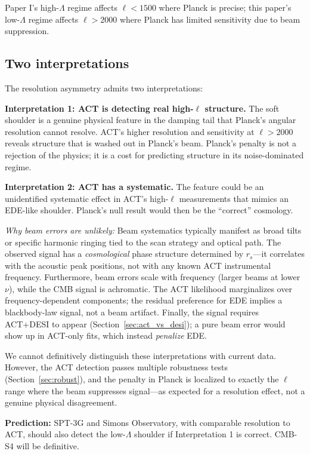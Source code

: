 \documentclass[twocolumn,showpacs,preprintnumbers,amsmath,amssymb,prd]{revtex4-2}
\begin{document}
Paper I's high-$\Lambda$ regime affects $\ell < 1500$ where Planck is precise; 
this paper's low-$\Lambda$ regime affects $\ell > 2000$ where Planck has 
limited sensitivity due to beam suppression.

\subsection{Two interpretations}

The resolution asymmetry admits two interpretations:

\textbf{Interpretation 1: ACT is detecting real high-$\ell$ structure.}
The soft shoulder is a genuine physical feature in the damping tail that 
Planck's angular resolution cannot resolve. ACT's higher resolution and 
sensitivity at $\ell > 2000$ reveals structure that is washed out in 
Planck's beam. Planck's penalty is not a rejection of the physics; it is 
a cost for predicting structure in its noise-dominated regime.

\textbf{Interpretation 2: ACT has a systematic.}
The feature could be an unidentified systematic effect in ACT's high-$\ell$ 
measurements that mimics an EDE-like shoulder. Planck's null result would 
then be the ``correct'' cosmology.

\emph{Why beam errors are unlikely:} Beam systematics typically manifest as 
broad tilts or specific harmonic ringing tied to the scan strategy and 
optical path. The observed signal has a \emph{cosmological} phase structure 
determined by $r_s$---it correlates with the acoustic peak positions, not 
with any known ACT instrumental frequency. Furthermore, beam errors scale 
with frequency (larger beams at lower $\nu$), while the CMB signal is 
achromatic. The ACT likelihood marginalizes over frequency-dependent 
components; the residual preference for EDE implies a blackbody-law signal, 
not a beam artifact. Finally, the signal requires ACT+DESI to appear 
(Section~\ref{sec:act_vs_desi}); a pure beam error would show up in 
ACT-only fits, which instead \emph{penalize} EDE.

We cannot definitively distinguish these interpretations with current data. 
However, the ACT detection passes multiple robustness tests 
(Section~\ref{sec:robust}), and the penalty in Planck is localized to 
exactly the $\ell$ range where the beam suppresses signal---as expected 
for a resolution effect, not a genuine physical disagreement.

\textbf{Prediction:} SPT-3G and Simons Observatory, with comparable 
resolution to ACT, should also detect the low-$\Lambda$ shoulder if 
Interpretation 1 is correct. CMB-S4 will be definitive.
\end{document}
